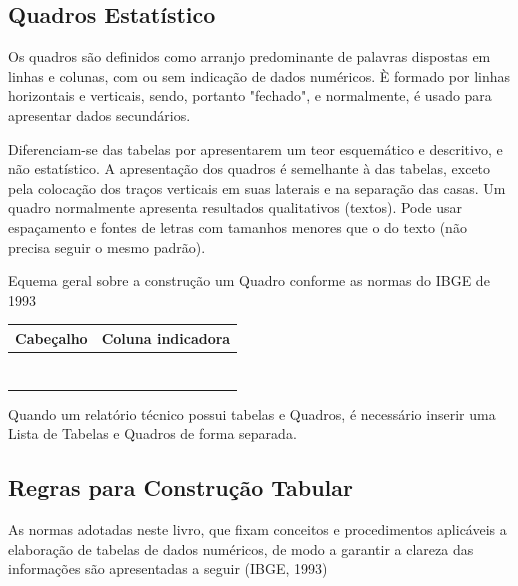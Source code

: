 \newpage
\subsection{Quadros Estatístico}

\inic Os quadros são definidos como arranjo predominante de palavras dispostas em linhas e colunas, com ou sem indicação de dados numéricos. È formado por linhas horizontais e verticais, sendo, portanto "fechado", e normalmente, é usado para apresentar dados secundários.\vskip0.3cm 

\inic Diferenciam-se das tabelas por apresentarem um teor esquemático e descritivo, e não estatístico. A apresentação dos quadros é semelhante à das tabelas, exceto pela colocação dos traços verticais em suas laterais e na separação das casas. Um quadro normalmente apresenta resultados qualitativos (textos). Pode usar espaçamento e fontes de letras com tamanhos menores que o do texto (não precisa seguir o mesmo padrão).   

\begin{quadro}[h!tp]
    \centering
    \caption{Equema geral sobre a construção um Quadro conforme as normas do IBGE de 1993}
    \begin{tabular}{|c|c|}
    \hline
    Cabeçalho  & Coluna indicadora   \\    
    \hline
           &           \\
           &              \\
           &              \\
           &              \\
           &              \\
           &              \\
           &              \\
  \hline
    \end{tabular}
\end{quadro}



\inic Quando um relatório técnico possui tabelas  e Quadros, é necessário inserir uma Lista de Tabelas e Quadros de forma separada.


\newpage
\subsection{Regras para Construção Tabular}

\inic As normas adotadas neste livro, que fixam conceitos e procedimentos aplicáveis a elaboração de tabelas de dados numéricos, de modo a garantir a clareza das informações são apresentadas a seguir (IBGE, 1993)


